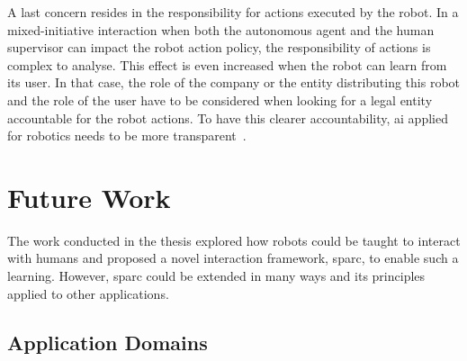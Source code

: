 A last concern resides in the responsibility for actions executed by the robot. In a mixed-initiative interaction when both the autonomous agent and the human supervisor can impact the robot action policy, the responsibility of actions is complex to analyse. This effect is even increased when the robot can learn from its user. In that case, the role of the company or the entity distributing this robot and the role of the user have to be considered when looking for a legal entity accountable for the robot actions. To have this clearer accountability, \gls{ai} applied for robotics needs to be more transparent~\citep{wachter2017transparent}.

\section{Future Work}
The work conducted in the thesis explored how robots could be taught to interact with humans and proposed a novel interaction framework, \gls{sparc}, to enable such a learning. However, \gls{sparc} could be extended in many ways and its principles applied to other applications.

\subsection{Application Domains}


